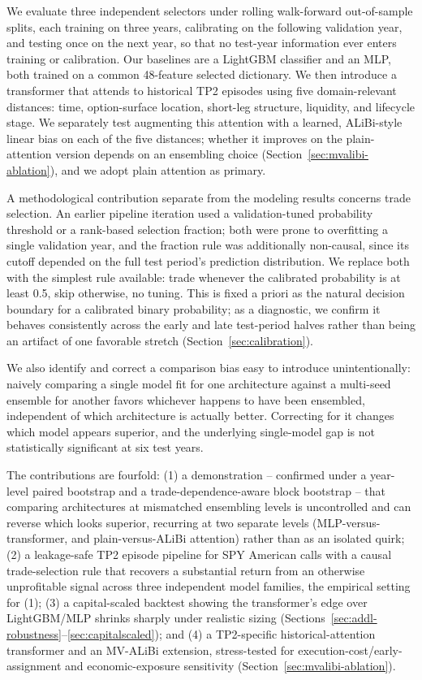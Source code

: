 \documentclass[sigconf,review]{acmart}
\begin{document}
We evaluate three independent selectors under rolling walk-forward out-of-sample splits, each training on three years, calibrating on the following validation year, and testing once on the next year, so that no test-year information ever enters training or calibration. Our baselines are a LightGBM classifier and an MLP, both trained on a common 48-feature selected dictionary. We then introduce a transformer that attends to historical TP2 episodes using five domain-relevant distances: time, option-surface location, short-leg structure, liquidity, and lifecycle stage. We separately test augmenting this attention with a learned, ALiBi-style linear bias on each of the five distances; whether it improves on the plain-attention version depends on an ensembling choice (Section~\ref{sec:mvalibi-ablation}), and we adopt plain attention as primary.

A methodological contribution separate from the modeling results concerns trade selection. An earlier pipeline iteration used a validation-tuned probability threshold or a rank-based selection fraction; both were prone to overfitting a single validation year, and the fraction rule was additionally non-causal, since its cutoff depended on the full test period's prediction distribution. We replace both with the simplest rule available: trade whenever the calibrated probability is at least 0.5, skip otherwise, no tuning. This is fixed a priori as the natural decision boundary for a calibrated binary probability; as a diagnostic, we confirm it behaves consistently across the early and late test-period halves rather than being an artifact of one favorable stretch (Section~\ref{sec:calibration}).

We also identify and correct a comparison bias easy to introduce unintentionally: naively comparing a single model fit for one architecture against a multi-seed ensemble for another favors whichever happens to have been ensembled, independent of which architecture is actually better. Correcting for it changes which model appears superior, and the underlying single-model gap is not statistically significant at six test years.

The contributions are fourfold: (1) a demonstration -- confirmed under a year-level paired bootstrap and a trade-dependence-aware block bootstrap -- that comparing architectures at mismatched ensembling levels is uncontrolled and can reverse which looks superior, recurring at two separate levels (MLP-versus-transformer, and plain-versus-ALiBi attention) rather than as an isolated quirk; (2) a leakage-safe TP2 episode pipeline for SPY American calls with a causal trade-selection rule that recovers a substantial return from an otherwise unprofitable signal across three independent model families, the empirical setting for (1); (3) a capital-scaled backtest showing the transformer's edge over LightGBM/MLP shrinks sharply under realistic sizing (Sections~\ref{sec:addl-robustness}--\ref{sec:capitalscaled}); and (4) a TP2-specific historical-attention transformer and an MV-ALiBi extension, stress-tested for execution-cost/early-assignment and economic-exposure sensitivity (Section~\ref{sec:mvalibi-ablation}).
\end{document}
